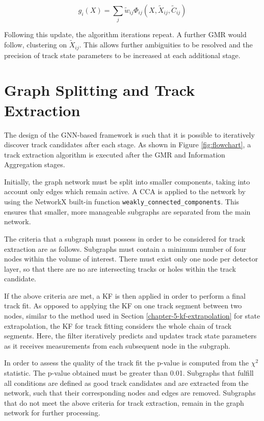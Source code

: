 \begin{equation}
g_i(X) = \sum_{j} \widetilde{w}_{ij}\Phi_{ij}(X, \widetilde{X}_{ij}, \widetilde{C}_{ij})
\label{eqn:updated-gaussian-mixture}
\end{equation}

Following this update, the algorithm iterations repeat. A further GMR would follow, clustering on $\widetilde{X}_{ij}$. This allows further ambiguities to be resolved and the precision of track state parameters to be increased at each additional stage.






\section{Graph Splitting and Track Extraction}
\label{gnn-track-extration}

The design of the GNN-based framework is such that it is possible to iteratively discover track candidates after each stage. As shown in Figure \ref{fig:flowchart}, a track extraction algorithm is executed after the GMR and Information Aggregation stages.

Initially, the graph network must be split into smaller components, taking into account only edges which remain active. A CCA is applied to the network by using the NetworkX built-in function \texttt{weakly\_connected\_components}. This ensures that smaller, more manageable subgraphs are separated from the main network.

The criteria that a subgraph must possess in order to be considered for track extraction are as follows. Subgraphs must contain a minimum number of four nodes within the volume of interest. There must exist only one node per detector layer, so that there are no are intersecting tracks or holes within the track candidate. 

If the above criteria are met, a KF is then applied in order to perform a final track fit. As opposed to applying the KF on one track segment between two nodes, similar to the method used in Section \ref{chapter-5-kf-extrapolation} for state extrapolation, the KF for track fitting considers the whole chain of track segments. Here, the filter iteratively predicts and updates track state parameters as it receives measurements from each subsequent node in the subgraph.

In order to assess the quality of the track fit the p-value is computed from the $\chi^2$ statistic. The p-value obtained must be greater than 0.01. Subgraphs that fulfill all conditions are defined as good track candidates and are extracted from the network, such that their corresponding nodes and edges are removed. Subgraphs that do not meet the above criteria for track extraction, remain in the graph network for further processing.





